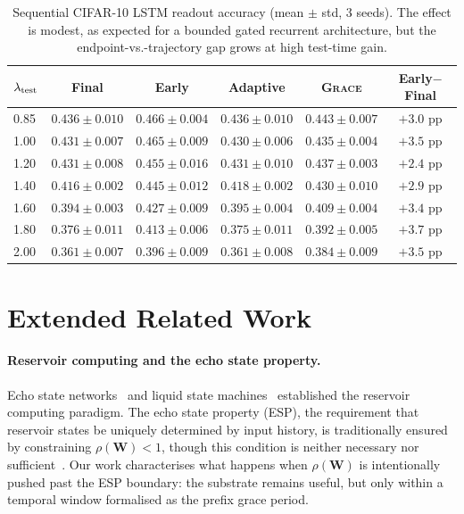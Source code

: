 \documentclass{article}
\theoremstyle{remark}
\newcommand{\bW}{\mathbf{W}}
\newcommand{\grace}{\textnormal{\textsc{Grace}}}
\newcommand{\sr}{\rho(\bW)}
\begin{document}
\begin{table}[H]
\centering
\caption{Sequential CIFAR-10 LSTM readout accuracy (mean $\pm$ std, 3 seeds).
The effect is modest, as expected for a bounded gated recurrent architecture,
but the endpoint-vs.-trajectory gap grows at high test-time gain.}
\label{tab:seq_cifar_lstm}
\small
\begin{tabular}{l c c c c c}
\toprule
$\lambda_{\rm test}$ & Final & Early & Adaptive & \grace{} & Early$-$Final \\
\midrule
0.85 & $0.436{\pm}0.010$ & $0.466{\pm}0.004$ & $0.436{\pm}0.010$ & $0.443{\pm}0.007$ & $+3.0$ pp \\
1.00 & $0.431{\pm}0.007$ & $0.465{\pm}0.009$ & $0.430{\pm}0.006$ & $0.435{\pm}0.004$ & $+3.5$ pp \\
1.20 & $0.431{\pm}0.008$ & $0.455{\pm}0.016$ & $0.431{\pm}0.010$ & $0.437{\pm}0.003$ & $+2.4$ pp \\
1.40 & $0.416{\pm}0.002$ & $0.445{\pm}0.012$ & $0.418{\pm}0.002$ & $0.430{\pm}0.010$ & $+2.9$ pp \\
1.60 & $0.394{\pm}0.003$ & $0.427{\pm}0.009$ & $0.395{\pm}0.004$ & $0.409{\pm}0.004$ & $+3.4$ pp \\
1.80 & $0.376{\pm}0.011$ & $0.413{\pm}0.006$ & $0.375{\pm}0.011$ & $0.392{\pm}0.005$ & $+3.7$ pp \\
2.00 & $0.361{\pm}0.007$ & $0.396{\pm}0.009$ & $0.361{\pm}0.008$ & $0.384{\pm}0.009$ & $+3.5$ pp \\
\bottomrule
\end{tabular}
\end{table}



\section{Extended Related Work}
\label{app:related}

\paragraph{Reservoir computing and the echo state property.}
Echo state networks~\citep{jaeger2001echo} and liquid state
machines~\citep{maass2002real} established the reservoir computing paradigm.
The echo state property (ESP), the requirement that reservoir states be
uniquely determined by input history, is traditionally ensured by
constraining $\sr < 1$, though this condition is neither necessary nor
sufficient~\citep{yildiz2012revisiting}. Our work characterises what happens
when $\sr$ is intentionally pushed past the ESP boundary: the substrate
remains useful, but only within a temporal window formalised as the prefix
grace period.
\end{document}
